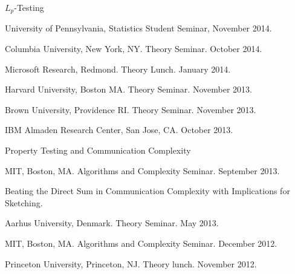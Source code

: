 \documentclass[11pt]{article}
\newenvironment{innerlist}[1][\enskip\textbullet]%
        {\begin{compactitem}[#1]}{\end{compactitem}}
\begin{document}
\begin{innerlist}
\item $L_p$-Testing
\begin{innerlist}
\item University of Pennsylvania, Statistics Student Seminar, November 2014.
\item Columbia University, New York, NY. Theory Seminar. October 2014.
\item Microsoft Research, Redmond. Theory Lunch. January 2014.
\item Harvard University, Boston MA. Theory Seminar. November 2013.
\item Brown University, Providence RI. Theory Seminar. November 2013.
\item IBM Almaden Research Center, San Jose, CA. October 2013.
\end{innerlist}

\item Property Testing and Communication Complexity
\begin{innerlist}
\item MIT, Boston, MA. Algorithms and Complexity Seminar. September 2013.
\end{innerlist}

\begin{comment}
\item Accurate and Efficient Private Release of Data Cubes and Contingency Tables
\begin{innerlist}
\item Cornell University, CDI Project Meeting. May 2013.
\end{innerlist}
\end{comment}

\item Beating the Direct Sum in Communication Complexity with Implications for Sketching.
\begin{innerlist}
\item Aarhus University, Denmark. Theory Seminar. May 2013.
\item MIT, Boston, MA. Algorithms and Complexity Seminar. December 2012.
\item Princeton University, Princeton, NJ. Theory lunch. November 2012.
\end{innerlist}



\end{innerlist}
\end{document}
